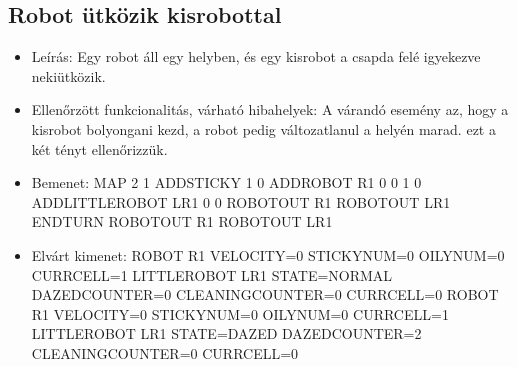 \subsection{Robot ütközik kisrobottal}
\begin{itemize}
	\item Leírás: \newline
	Egy robot áll egy helyben, és egy kisrobot a csapda felé igyekezve nekiütközik.
	\item Ellenőrzött funkcionalitás, várható hibahelyek: \newline
	A várandó esemény az, hogy a kisrobot bolyongani kezd, a robot pedig változatlanul a helyén marad. ezt a két tényt ellenőrizzük.
	\item Bemenet: \newline
	MAP 2 1 \newline
	ADDSTICKY 1 0 \newline
	ADDROBOT R1 0 0 1 0 \newline
	ADDLITTLEROBOT LR1 0 0 \newline
	ROBOTOUT R1 \newline
	ROBOTOUT LR1 \newline
	ENDTURN \newline
	ROBOTOUT R1 \newline
	ROBOTOUT LR1 \newline

	\item Elvárt kimenet: \newline
	ROBOT R1 VELOCITY=0 STICKYNUM=0 OILYNUM=0 CURRCELL=1 \newline
	LITTLEROBOT LR1 STATE=NORMAL DAZEDCOUNTER=0 CLEANINGCOUNTER=0 CURRCELL=0 \newline
	ROBOT R1 VELOCITY=0 STICKYNUM=0 OILYNUM=0 CURRCELL=1 \newline
	LITTLEROBOT LR1 STATE=DAZED DAZEDCOUNTER=2 CLEANINGCOUNTER=0 CURRCELL=0 \newline
\end{itemize}

